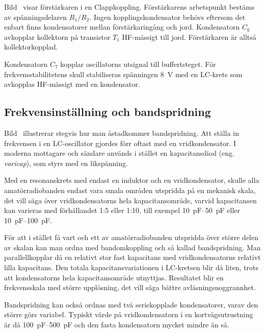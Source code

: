 \newpage
Bild~ visar förstärkaren i en Clappkoppling.
Förstärkarens arbetspunkt bestäms av spänningsdelaren \(R_1/R_2\).
Ingen kopplingskondensator behövs eftersom det enbart finns kondensatorer
mellan förstärkaringång och jord.
Kondensatorn \(C_6\) avkopplar kollektorn på transistor \(T_1\) HF-mässigt till
jord.
Förstärkaren är alltså kollektorkopplad.

Kondensatorn \(C_7\) kopplar oscillatorns utsignal till buffertsteget.
För frekvensstabilitetens skull stabiliseras spänningen \qty{8}{\volt} med en
LC-krets som avkopplas HF-mässigt med en kondensator.

\subsection{Frekvensinställning och bandspridning}


Bild~ illustrerar stegvis hur man åstadkommer
bandspridning.
Att ställa in frekvensen i en LC-oscillator gjordes förr oftast med en
vridkondensator.
I moderna mottagare och sändare används i stället en kapacitansdiod 
(eng. \emph{varicap}), som styrs med en likspänning.

Med en resonanskrets med endast en induktor och en vridkondensator, skulle
alla amatörradiobanden endast vara smala områden utspridda på en mekanisk
skala, det vill säga över vridkondensatorns hela kapacitansområde, varvid
kapacitansen kan varieras med förhållandet 1:5 eller 1:10, till exempel
\SIrange{10}{50}{\pico\farad} eller \SIrange{10}{100}{\pico\farad}.

För att i stället få vart och ett av amatörradiobanden utspridda över större
delen av skalan kan man ordna med bandomkoppling och så kallad bandspridning.
Man parallellkopplar då en relativt stor fast kapacitans med vridkondensatorns
relativt lilla kapacitans.
Den totala kapacitansvariationen i LC-kretsen blir då liten, trots att
kondensatorns hela kapacitansområde utnyttjas.
Resultatet blir en frekvensskala med större upplösning, det vill säga bättre
avläsningsnoggrannhet.

Bandspridning kan också ordnas med två seriekopplade kondensatorer,
varav den större görs variabel.
Typiskt värde på vridkondensatorn i en kortvågsutrustning är då
\SIrange{100}{500}{\pico\farad} och den fasta kondensatorn mycket mindre än så.
